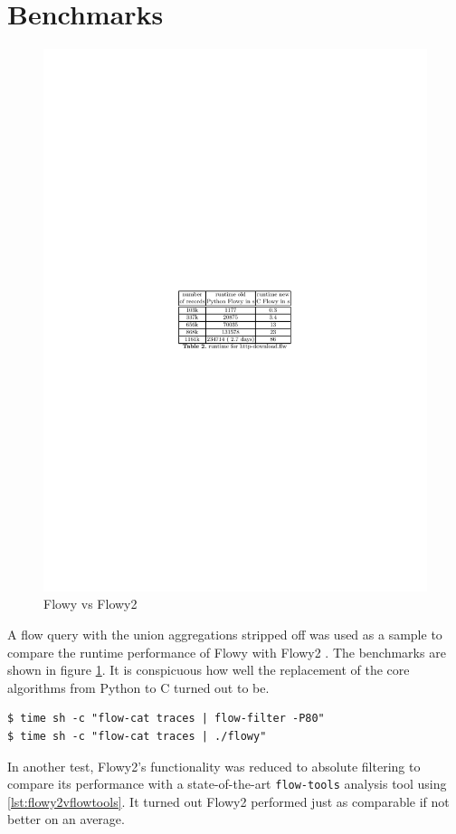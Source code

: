 \section{Benchmarks}\label{sec:benchmarks}
\begin{figure}[h!]
\begin{center}
  \includegraphics* [width=0.6\linewidth]{figures/flowy2-benchmarks}	
  \caption{Flowy vs Flowy2 \cite{jschauer:thesis:2011}}
  \label{fig:flowy2-benchmarks}
\end{center}
\end{figure}
A flow query with the union aggregations stripped off was used as a sample to compare the runtime performance of Flowy \cite{kkanev:thesis:2009} with Flowy2 \cite{jschauer:thesis:2011} . The benchmarks are shown in figure \ref{fig:flowy2-benchmarks}. It is conspicuous how well the replacement of the core algorithms from Python to C turned out to be. 

\begin{lstlisting}
$ time sh -c "flow-cat traces | flow-filter -P80"
$ time sh -c "flow-cat traces | ./flowy"
\end{lstlisting}

In another test, Flowy2's functionality was reduced to absolute filtering to compare its performance with a state-of-the-art \texttt{flow-tools} analysis tool using \ref{lst:flowy2vflowtools}. It turned out Flowy2 performed just as comparable if not better on an average.


